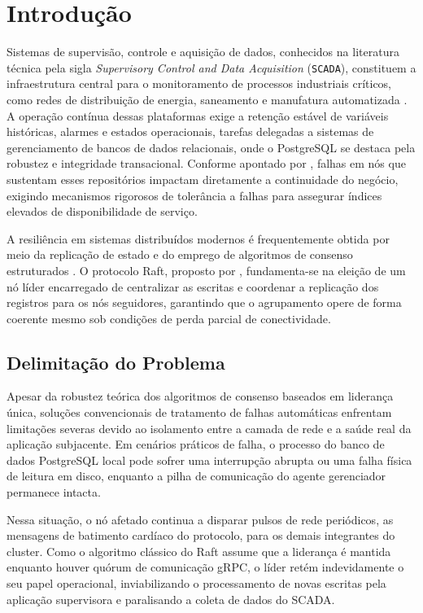 \chapter{Introdução}
\label{cap:introducao}

Sistemas de supervisão, controle e aquisição de dados, conhecidos na literatura técnica pela sigla \textit{Supervisory Control and Data Acquisition} (\verb|SCADA|), constituem a infraestrutura central para o monitoramento de processos industriais críticos, como redes de distribuição de energia, saneamento e manufatura automatizada \cite{yadav2021}. A operação contínua dessas plataformas exige a retenção estável de variáveis históricas, alarmes e estados operacionais, tarefas delegadas a sistemas de gerenciamento de bancos de dados relacionais, onde o PostgreSQL se destaca pela robustez e integridade transacional. Conforme apontado por , falhas em nós que sustentam esses repositórios impactam diretamente a continuidade do negócio, exigindo mecanismos rigorosos de tolerância a falhas para assegurar índices elevados de disponibilidade de serviço.

A resiliência em sistemas distribuídos modernos é frequentemente obtida por meio da replicação de estado e do emprego de algoritmos de consenso estruturados \cite{sa2011mecanismos}. O protocolo Raft, proposto por , fundamenta-se na eleição de um nó líder encarregado de centralizar as escritas e coordenar a replicação dos registros para os nós seguidores, garantindo que o agrupamento opere de forma coerente mesmo sob condições de perda parcial de conectividade.

\section{Delimitação do Problema}

Apesar da robustez teórica dos algoritmos de consenso baseados em liderança única, soluções convencionais de tratamento de falhas automáticas enfrentam limitações severas devido ao isolamento entre a camada de rede e a saúde real da aplicação subjacente. Em cenários práticos de falha, o processo do banco de dados PostgreSQL local pode sofrer uma interrupção abrupta ou uma falha física de leitura em disco, enquanto a pilha de comunicação do agente gerenciador permanece intacta.

Nessa situação, o nó afetado continua a disparar pulsos de rede periódicos, as mensagens de batimento cardíaco do protocolo, para os demais integrantes do cluster. Como o algoritmo clássico do Raft assume que a liderança é mantida enquanto houver quórum de comunicação gRPC, o líder retém indevidamente o seu papel operacional, inviabilizando o processamento de novas escritas pela aplicação supervisora e paralisando a coleta de dados do SCADA.

